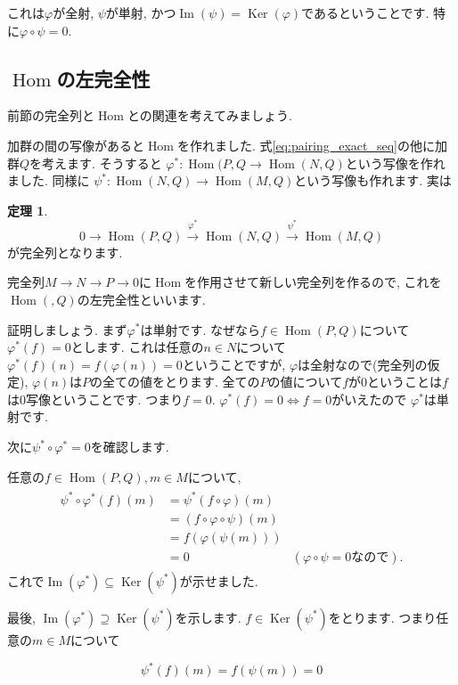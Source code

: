 \documentclass{jsarticle}
\newcommand{\makeop}[1]{\mathop{\mathrm{#1}}\nolimits}
\def\Im{\makeop{Im}}
\def\Ker{\makeop{Ker}}
\def\Hom{\makeop{Hom}}
\theoremstyle{definition}
\newtheorem{theorem}{定理}
\numberwithin{theorem}{section}
\begin{document}
これは$\varphi$が全射, $\psi$が単射, かつ$\Im(\psi) = \Ker(\varphi)$であるということです. 特に$\varphi\circ\psi = 0$.

\subsection{$\Hom$の左完全性}
前節の完全列と$\Hom$との関連を考えてみましょう.

加群の間の写像があると$\Hom$を作れました. 式\ref{eq:pairing_exact_seq}の他に加群$Q$を考えます. そうすると
$\varphi^*: \Hom(P, Q \rightarrow \Hom(N, Q)$という写像を作れました. 同様に
$\psi^*: \Hom(N, Q) \rightarrow \Hom(M, Q)$という写像も作れます. 実は

\begin{theorem}
\[
0 \rightarrow \Hom(P, Q) \xrightarrow{\varphi^*} \Hom(N, Q) \xrightarrow{\psi^*} \Hom(M, Q)
\]
が完全列となります.
\end{theorem}
完全列$M\rightarrow N \rightarrow P \rightarrow 0$に$\Hom$を作用させて新しい完全列を作るので,
これを$\Hom(, Q)$の左完全性といいます.

証明しましょう. まず$\varphi^*$は単射です. なぜなら$f \in \Hom(P, Q)$について$\varphi^*(f) = 0$とします. これは任意の$n\in N$について
$\varphi^*(f)(n) = f(\varphi(n)) = 0$ということですが, $\varphi$は全射なので(完全列の仮定), $\varphi(n)$は$P$の全ての値をとります.
全ての$P$の値について$f$が0ということは$f$は0写像ということです. つまり$f=0$. $\varphi^*(f) = 0 \Leftrightarrow f = 0$がいえたので
$\varphi^*$は単射です.

次に$\psi^*\circ\varphi^* = 0$を確認します.

任意の$f\in\Hom(P, Q), m \in M$について,
\begin{eqnarray*}
\begin{aligned}
\psi^*\circ\varphi^*(f)(m) &= \psi^*(f\circ\varphi)(m)\\
&= (f\circ\varphi\circ\psi)(m)\\
&= f(\varphi(\psi(m)))\\
&= 0 & (\varphi\circ\psi = 0なので).
\end{aligned}
\end{eqnarray*}
これで$\Im(\varphi^*)\subseteq\Ker(\psi^*)$が示せました.

最後, $\Im(\varphi^*)\supseteq \Ker(\psi^*)$を示します. $f\in\Ker(\psi^*)$をとります. つまり任意の$m\in M$について

\begin{equation}
\label{eq:cond_im_elem}
\psi^*(f)(m) = f(\psi(m)) = 0
\end{equation}
\end{document}
